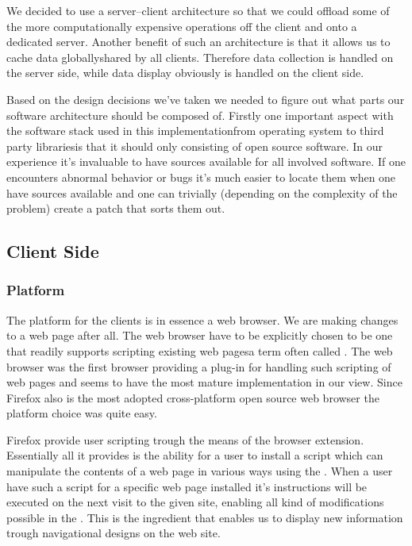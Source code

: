 We decided to use a server--client architecture so that we could offload some
of the more computationally expensive operations off the client and onto a
dedicated server. Another benefit of such an architecture is that it allows us
to cache data globally\dash{}shared by all clients. Therefore data collection
is handled on the server side, while data display obviously is handled on
the client side.

Based on the design decisions we've taken we needed to figure out what parts
our software architecture should be composed of. 
Firstly one important aspect with the software stack used in this
implementation\dash{}from operating system to third party libraries\dash{}is
that it should only consisting of open source software. In our experience it's
invaluable to have sources available for all involved software. If one
encounters abnormal behavior or bugs it's much easier to locate them when one
have sources available and one can trivially (depending on the complexity of
the problem) create a patch that sorts them out.

\subsection{Client Side}

\subsubsection{Platform}
\label{section:implementation.architecture.client.side.platform}

The platform for the clients is in essence a web browser. We are making
changes to a web page after all. The web browser have to be explicitly chosen
to be one that readily supports scripting existing
web pages\dash{}a term often called .
The %
web browser was the first browser providing a
plug-in for handling such scripting of web pages and seems to have the most
mature implementation in our view. Since Firefox also is the
most adopted%
cross-platform open source web browser the platform choice was quite easy.

Firefox provide user scripting trough the means of the
%
browser extension. Essentially all it provides is the ability for a user to
install a script which can manipulate the contents of a web page
in various ways using the %
.
When a user have such a script for a specific web page installed it's
instructions will be executed on the next visit to the given site, enabling
all kind of modifications possible in the . This is the ingredient
that enables us to display new information trough navigational designs on the
\urort web site.

